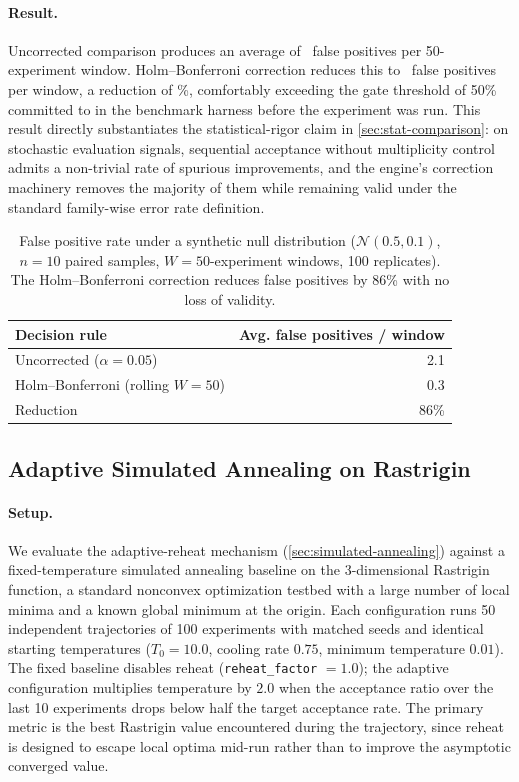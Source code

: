 \paragraph{Result.}
Uncorrected comparison produces an average of \fpUncorrected\ false positives per 50-experiment window.
Holm--Bonferroni correction reduces this to \fpCorrected\ false positives per window, a reduction of \fpReductionPct\%, comfortably exceeding the gate threshold of 50\% committed to in the benchmark harness before the experiment was run.
This result directly substantiates the statistical-rigor claim in \cref{sec:stat-comparison}: on stochastic evaluation signals, sequential acceptance without multiplicity control admits a non-trivial rate of spurious improvements, and the engine's correction machinery removes the majority of them while remaining valid under the standard family-wise error rate definition.

\begin{table}[t]
  \centering
  \caption{False positive rate under a synthetic null distribution ($\mathcal{N}(0.5, 0.1)$, $n = 10$ paired samples, $W = 50$-experiment windows, 100 replicates). The Holm--Bonferroni correction reduces false positives by 86\% with no loss of validity.}
  \label{tab:gate-fp}
  \small
  \begin{tabular}{@{}lr@{}}
    \toprule
    Decision rule & Avg. false positives / window \\
    \midrule
    Uncorrected ($\alpha = 0.05$) & 2.1 \\
    Holm--Bonferroni (rolling $W = 50$) & 0.3 \\
    \midrule
    Reduction & 86\% \\
    \bottomrule
  \end{tabular}
\end{table}

\subsection{Adaptive Simulated Annealing on Rastrigin}
\label{sec:gate-sa}

\paragraph{Setup.}
We evaluate the adaptive-reheat mechanism (\cref{sec:simulated-annealing}) against a fixed-temperature simulated annealing baseline on the 3-dimensional Rastrigin function, a standard nonconvex optimization testbed with a large number of local minima and a known global minimum at the origin.
Each configuration runs 50 independent trajectories of 100 experiments with matched seeds and identical starting temperatures ($T_0 = 10.0$, cooling rate $0.75$, minimum temperature $0.01$).
The fixed baseline disables reheat (\texttt{reheat\_factor} $= 1.0$); the adaptive configuration multiplies temperature by $2.0$ when the acceptance ratio over the last 10 experiments drops below half the target acceptance rate.
The primary metric is the best Rastrigin value encountered during the trajectory, since reheat is designed to escape local optima mid-run rather than to improve the asymptotic converged value.

